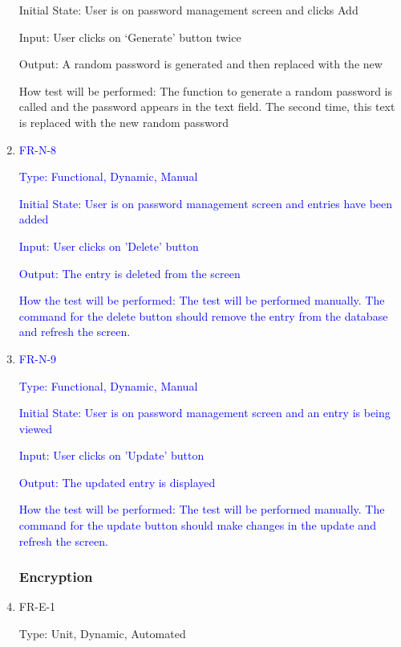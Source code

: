 \documentclass[12pt, titlepage]{article}
\begin{document}
\begin{enumerate}
Initial State: User is on password management screen and clicks Add

Input: User clicks on ‘Generate’ button twice

Output: A random password is generated and then replaced with the new 

How test will be performed: The function to generate a random password is called and the password appears in the text field. The second time, this text is replaced with the new random password

\item{\textcolor{blue}{FR-N-8}\\}

\textcolor{blue}{Type: Functional, Dynamic, Manual}

\textcolor{blue}{Initial State: User is on password management screen and entries have been added}

\textcolor{blue}{Input: User clicks on 'Delete' button}

\textcolor{blue}{Output: The entry is deleted from the screen}

\textcolor{blue}{How the test will be performed: The test will be performed manually. The command for the delete button should remove the entry from the database and refresh the screen.}

\item{\textcolor{blue}{FR-N-9}\\}

\textcolor{blue}{Type: Functional, Dynamic, Manual}

\textcolor{blue}{Initial State: User is on password management screen and an entry is being viewed}

\textcolor{blue}{Input: User clicks on 'Update' button}

\textcolor{blue}{Output: The updated entry is displayed}

\textcolor{blue}{How the test will be performed: The test will be performed manually. The command for the update button should make changes in the update and refresh the screen.}

\subsubsection{Encryption}

\item{FR-E-1\\}

Type: Unit, Dynamic, Automated


\end{enumerate}
\end{document}
